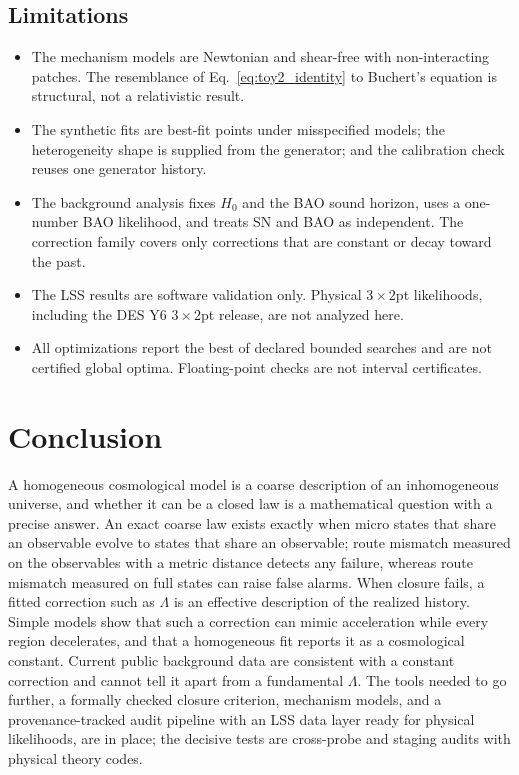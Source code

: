 \documentclass[11pt]{article}
\theoremstyle{plain}
\theoremstyle{definition}
\theoremstyle{remark}
\begin{document}
\subsection{Limitations}\label{sec:discussion:limitations}

\begin{itemize}
  \item The mechanism models are Newtonian and shear-free with non-interacting patches. The resemblance of Eq.~\eqref{eq:toy2_identity} to Buchert's equation is structural, not a relativistic result.
  \item The synthetic fits are best-fit points under misspecified models; the heterogeneity shape is supplied from the generator; and the calibration check reuses one generator history.
  \item The background analysis fixes $H_0$ and the BAO sound horizon, uses a one-number BAO likelihood, and treats SN and BAO as independent. The correction family covers only corrections that are constant or decay toward the past.
  \item The LSS results are software validation only. Physical $3\times2$pt likelihoods, including the DES Y6 $3\times2$pt release, are not analyzed here.
  \item All optimizations report the best of declared bounded searches and are not certified global optima. Floating-point checks are not interval certificates.
\end{itemize}

\section{Conclusion}\label{sec:conclusion}

A homogeneous cosmological model is a coarse description of an inhomogeneous universe, and whether it can be a closed law is a mathematical question with a precise answer. An exact coarse law exists exactly when micro states that share an observable evolve to states that share an observable; route mismatch measured on the observables with a metric distance detects any failure, whereas route mismatch measured on full states can raise false alarms. When closure fails, a fitted correction such as $\Lambda$ is an effective description of the realized history. Simple models show that such a correction can mimic acceleration while every region decelerates, and that a homogeneous fit reports it as a cosmological constant. Current public background data are consistent with a constant correction and cannot tell it apart from a fundamental $\Lambda$. The tools needed to go further, a formally checked closure criterion, mechanism models, and a provenance-tracked audit pipeline with an LSS data layer ready for physical likelihoods, are in place; the decisive tests are cross-probe and staging audits with physical theory codes.
\end{document}
